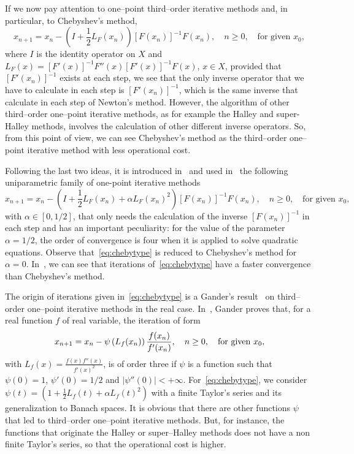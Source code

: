\documentclass[11pt,twoside,letterpaper]{article} %
\begin{document}
If we now pay attention to one--point third--order iterative methods and, in particular, to Chebyshev's method,
$$
x_{n+1}=x_n-\left(I+\frac{1}{2}L_{F}(x_n)\right)
[F(x_n)]^{-1}F(x_n),\quad n\geq 0,
\quad\mbox{for given } x_0,
$$
where $I$ is the identity operator on $X$ and $L_F(x)=[F'(x)]^{-1}F''(x)[F'(x)]^{-1}F(x)$, $x\in X$, provided that $[F'(x_n)]^{-1}$ exists at each step, we see that the only inverse operator that we have to calculate in each step is $[F'(x_n)]^{-1}$, which is the same inverse that calculate in
each step of Newton's method. However, the algorithm of other third--order one--point iterative methods, as for example the Halley and super-Halley methods, involves the calculation of other different inverse operators. So, from this point of view, we can see Chebyshev's method as the third--order one--point iterative method with less operational cost.

Following the last two ideas, it is introduced in~\cite{EGHS} and used in~\cite{ABG} the following uniparametric family of one-point iterative methods
\begin{equation}
\label{eq:chebytype}
x_{n+1}=x_n-\left(I+\frac{1}{2}L_{F}(x_n)+\alpha L_{F}(x_n)^2\right)
[F(x_n)]^{-1}F(x_n),\quad n\geq 0,
\quad\mbox{for given } x_0,
\end{equation}
with $\alpha\in[0,1/2]$, that only needs the calculation of the inverse $[F(x_n)]^{-1}$ in each step and has an important peculiarity: for the value of the parameter $\alpha=1/2$, the order of convergence is four when it is applied to solve quadratic equations. Observe that~\eqref{eq:chebytype} is reduced to Chebyshev's method for $\alpha=0$. In~\cite{EGHS}, we can see that iterations of~\eqref{eq:chebytype} have a faster convergence than Chebyshev's method.

The origin of iterations given in~\eqref{eq:chebytype} is a Gander's result~\cite{Gan} on third--order one--point iterative methods in the real case. In~\cite{Gan}, Gander proves that, for a real function $f$ of real variable, the iteration of form
$$
x_{n+1} = x_n - \psi\left(L_f(x_n)\right){f(x_n) \over f'(x_n)},\quad n\geq 0,
\quad\mbox{for given } x_0, 
$$
with $L_f(x)=\frac{f(x)f''(x)}{f'(x)^2}$, is of order three if $\psi$ is a function such that $\psi(0)=1$, $\psi'(0)=1/2$ and $|\psi''(0)|<+\infty$.
For~\eqref{eq:chebytype}, we consider $\psi(t)=\left(1+\frac{1}{2}L_f(t)+\alpha L_f(t)^2\right)$ with a finite Taylor's series and its generalization to Banach spaces. It is obvious that there are other functions $\psi$ that led to third--order one--point iterative methods. But, for instance, the functions that originate the Halley or super--Halley methods does not have a non finite Taylor's series, so that the operational cost is higher.
\end{document}
